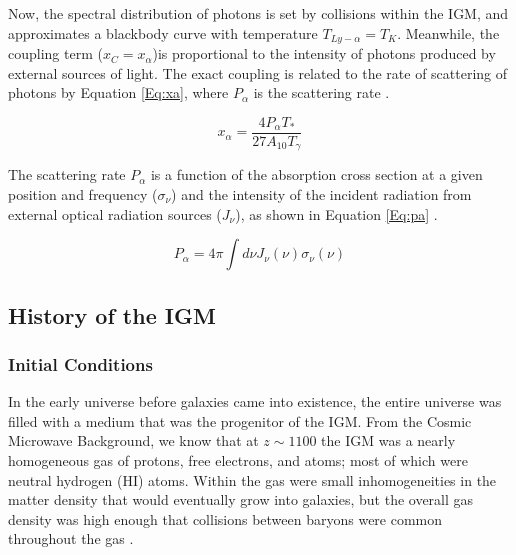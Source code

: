 Now, the spectral distribution of \lya  photons is set by collisions within the IGM, and approximates a blackbody curve with temperature $T_{Ly-\alpha} = T_K$. Meanwhile, the \lya  coupling term ($x_C = x_{\alpha}$)is proportional to the intensity of \lya  photons produced by external sources of light. The exact \lya  coupling is related to the rate of scattering of \lya  photons by Equation \ref{Eq:xa}, where $P_{\alpha}$ is the scattering rate \cite{furlanetto_2006}. 

\begin{equation}\label{Eq:xa}
x_{\alpha} = \frac{4 P_{\alpha} T_*}{27 A_{10} T_{\gamma}}
\end{equation}

The scattering rate $P_{\alpha}$ is a function of the absorption cross section at a given position and frequency ($\sigma_{\nu}$) and the intensity of the incident radiation from external optical radiation sources ($J_{\nu}$), as shown in Equation \ref{Eq:pa} \cite{furlanetto_2006}. 

\begin{equation}\label{Eq:pa}
P_{\alpha} = 4 \pi \int d\nu J_{\nu}(\nu) \sigma_{\nu}(\nu)
\end{equation}


\subsection{History of the IGM} \label{Sec:IGMhist}

\subsubsection{Initial Conditions}
In the early universe before galaxies came into existence, the entire universe was filled with a medium that was the progenitor of the IGM. From the Cosmic Microwave Background, we know that at $z \sim 1100$ the IGM was a nearly homogeneous gas of protons, free electrons, and atoms; most of which were neutral hydrogen (HI) atoms. Within the gas were small inhomogeneities in the matter density that would eventually grow into galaxies, but the overall gas density was high enough that collisions between baryons were common throughout the gas \cite{furlanetto_2006}. 

